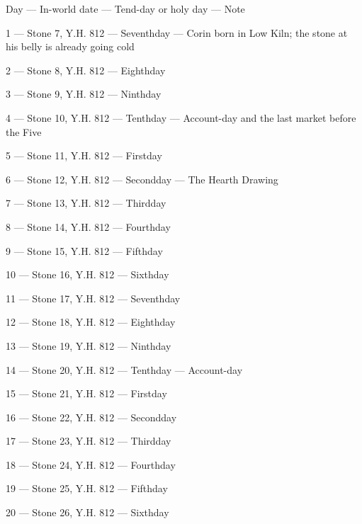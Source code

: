 \documentclass{design/chronicle}
\begin{document}
Day — In-world date — Tend-day or holy day — Note\par

1 — Stone 7, Y.H. 812 — Seventhday — Corin born in Low Kiln; the stone at his belly is already going cold\par

2 — Stone 8, Y.H. 812 — Eighthday\par

3 — Stone 9, Y.H. 812 — Ninthday\par

4 — Stone 10, Y.H. 812 — Tenthday — Account-day and the last market before the Five\par

5 — Stone 11, Y.H. 812 — Firstday\par

6 — Stone 12, Y.H. 812 — Secondday — The Hearth Drawing\par

7 — Stone 13, Y.H. 812 — Thirdday\par

8 — Stone 14, Y.H. 812 — Fourthday\par

9 — Stone 15, Y.H. 812 — Fifthday\par

10 — Stone 16, Y.H. 812 — Sixthday\par

11 — Stone 17, Y.H. 812 — Seventhday\par

12 — Stone 18, Y.H. 812 — Eighthday\par

13 — Stone 19, Y.H. 812 — Ninthday\par

14 — Stone 20, Y.H. 812 — Tenthday — Account-day\par

15 — Stone 21, Y.H. 812 — Firstday\par

16 — Stone 22, Y.H. 812 — Secondday\par

17 — Stone 23, Y.H. 812 — Thirdday\par

18 — Stone 24, Y.H. 812 — Fourthday\par

19 — Stone 25, Y.H. 812 — Fifthday\par

20 — Stone 26, Y.H. 812 — Sixthday\par
\end{document}
